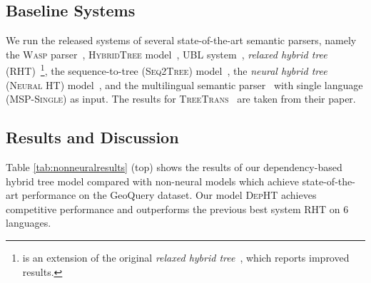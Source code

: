 \subsection{Baseline Systems}

We run the released systems of several state-of-the-art semantic parsers, namely the \textsc{Wasp} parser~\cite{wong2006learning}, \textsc{HybridTree} model~\cite{lu2008generative}, \textsc{UBL} system~\cite{kwiatkowski2010inducing},  \textit{relaxed hybrid tree} (\textsc{RHT})~\cite{lu2015constrained}\footnote{\cite{lu2015constrained} is an extension of the original \textit{relaxed hybrid tree}~\cite{lu2014semantic}, which reports improved results.}, the sequence-to-tree (\textsc{Seq2Tree}) model~\cite{dong2016language}, the \textit{neural hybrid tree} (\textsc{Neural HT}) model~\cite{susanto2017semantic}, and the multilingual semantic parser~\cite{susanto2017neural} with single language (\textsc{MSP-Single}) as input. 
The results for \textsc{TreeTrans}~\cite{jones2012semantic} are taken from their paper.


\subsection{Results and Discussion}



Table \ref{tab:nonneuralresults} (top) shows the results of our {dependency-based hybrid tree} model compared with non-neural models which achieve state-of-the-art performance on the GeoQuery dataset. 
Our model \textsc{DepHT} achieves competitive performance and outperforms the previous best system \textsc{RHT} on 6 languages.

